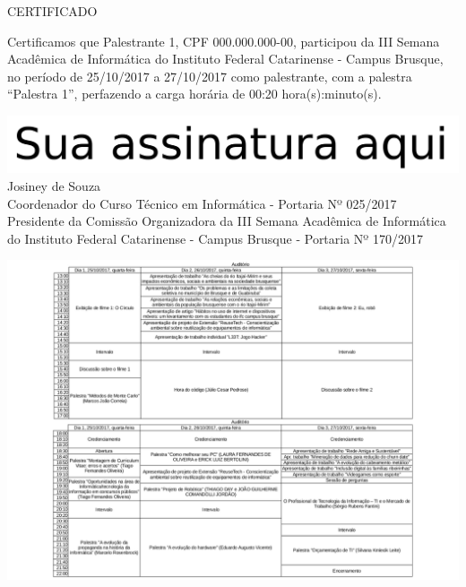 \documentclass{abnt}
\begin{document}
\BgThispage
\color{black}
\bf
\begin{center}
    \Huge{CERTIFICADO}
\end{center}

Certificamos que Palestrante 1, CPF 000.000.000-00, participou da III Semana Acadêmica de Informática do Instituto Federal Catarinense - Campus Brusque, no período de
25/10/2017 a 27/10/2017 como palestrante, com a palestra ``Palestra 1'', perfazendo a carga horária
de 00:20 hora(s):minuto(s).


\begin{center}
\includegraphics[scale=0.2]{../assinatura-pb.png}\\
Josiney de Souza\\
Coordenador do Curso Técnico em Informática - Portaria Nº 025/2017\\
Presidente da Comissão Organizadora da III Semana Acadêmica de Informática do Instituto Federal Catarinense - Campus Brusque - Portaria Nº 170/2017
\end{center}

\newpage
{}

\includegraphics[scale=0.85]{../juncao-grades.png}
\end{document}
